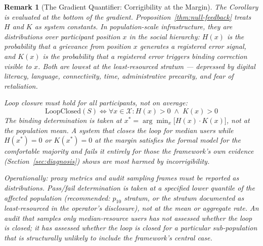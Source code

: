 \documentclass{article}
\newtheorem{remark}{Remark}[section]
\begin{document}
\begin{remark}[The Gradient Quantifier: Corrigibility at the Margin]
\label{rem:argmin}
The Corollary is evaluated at the bottom of the gradient. Proposition~\ref{thm:null-feedback} treats $H$ and $K$ as system constants. In population-scale infrastructure, they are distributions over participant position $x$ in the social hierarchy: $H(x)$ is the probability that a grievance from position $x$ generates a registered error signal, and $K(x)$ is the probability that a registered error triggers binding correction visible to $x$. Both are lowest at the least-resourced stratum --- depressed by digital literacy, language, connectivity, time, administrative precarity, and fear of retaliation.

Loop closure must hold for all participants, not on average:
\begin{equation}
\text{LoopClosed}(S) \iff \forall x \in \mathcal{X}: H(x) > 0 \;\land\; K(x) > 0
\end{equation}
The binding determination is taken at $x^* = \arg\min_x \bigl[ H(x) \cdot K(x) \bigr]$, not at the population mean. A system that closes the loop for median users while $H(x^*) = 0$ or $K(x^*) = 0$ at the margin satisfies the formal model for the comfortable majority and fails it entirely for those the framework's own evidence (Section~\ref{sec:diagnosis}) shows are most harmed by incorrigibility.

Operationally: proxy metrics and audit sampling frames must be reported as distributions. Pass/fail determination is taken at a specified lower quantile of the affected population (recommended: $p_{10}$ stratum, or the stratum documented as least-resourced in the operator's disclosure), not at the mean or aggregate rate. An audit that samples only median-resource users has not assessed whether the loop is closed; it has assessed whether the loop is closed for a particular sub-population that is structurally unlikely to include the framework's central case.
\end{remark}
\end{document}
